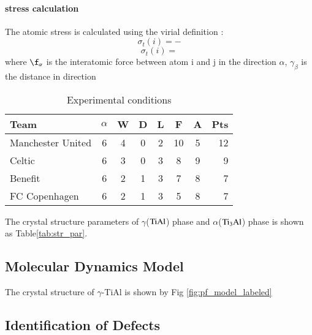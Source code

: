 \documentclass[final,5p,times,twocolumn]{elsarticle}
\begin{document}
\paragraph{stress calculation}
The atomic stress is calculated using the virial definition :
$$\sigma_t(i)=-$$
$$\sigma_t(i)= $$
where $\f_\alpha$ is the interatomic force between atom i and j in the direction $\alpha$, $\gamma_\beta$ is the distance in direction 








\begin{table}[H]
\centering
\caption{Experimental conditions}
\begin{tabular}{l*{6}{c}r}	
		\hline
		Team              & $\alpha$ & W & D & L & F  & A & Pts \\
		\hline
		Manchester United & 6 & 4 & 0 & 2 & 10 & 5 & 12  \\
		Celtic            & 6 & 3 & 0 & 3 &  8 & 9 &  9  \\
		Benefit           & 6 & 2 & 1 & 3 &  7 & 8 &  7  \\
		FC Copenhagen     & 6 & 2 & 1 & 3 &  5 & 8 &  7  \\
		\hline
\end{tabular}
\label{Tab:par}
\end{table}


The crystal structure parameters of $\gamma$($\rm TiAl$) phase and $\alpha$($\rm Ti_3Al$) phase is shown as Table\ref{tab:str_par}. 
\subsection{Molecular Dynamics Model}
The crystal structure of $\gamma$-TiAl
is shown by Fig \ref{fig:pf_model_labeled}

\subsection{Identification of Defects}
% 	
%
%
%
%
%
%
%
%
\end{document}
